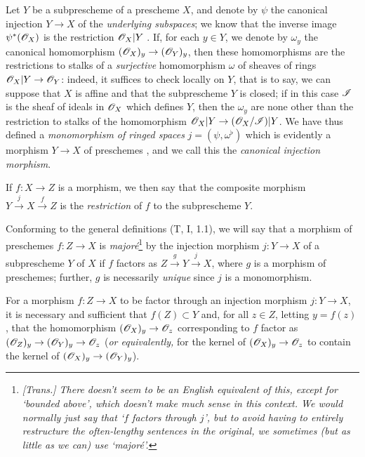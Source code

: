 \begin{env}[4.1.7]
\label{I.4.1.7}
Let $Y$ be a subprescheme of a prescheme $X$, and denote by $\psi$ the canonical injection $Y\to X$ of the \emph{underlying subspaces};
we know that the inverse image $\psi^*(\mathscr{O}_X)$ is the restriction $\mathscr{O}_X|Y$ .
If, for each $y\in Y$, we denote by $\omega_y$ the canonical homomorphism $(\sh{O}_X)_y\to(\sh{O}_Y)_y$, then these homomorphisms are the restrictions to stalks of a \emph{surjective} homomorphism $\omega$ of sheaves of rings $\sh{O}_X|Y\to\sh{O}_Y$: indeed, it suffices to check locally on $Y$, that is to say, we can suppose that $X$ is affine and that the subprescheme $Y$ is closed; if in this case $\mathscr{I}$ is the sheaf of ideals in $\mathscr{O}_X$ which defines $Y$, then the $\omega_y$ are none other than the restriction to stalks of the homomorphism $\sh{O}_X|Y\to(\sh{O}_X/\sh{I})|Y$.
We have thus defined a \emph{monomorphism of ringed spaces}  $j=(\psi,\omega^\flat)$ which is evidently a morphism $Y\to X$ of preschemes , and we call this the \emph{canonical injection morphism}.

If $f:X\to Z$ is a morphism, we then say that the composite morphism $Y\xrightarrow{j}X\xrightarrow{f}Z$ is the \emph{restriction} of $f$ to the subprescheme $Y$.
\end{env}

\begin{env}[4.1.8]
\label{I.4.1.8}
Conforming to the general definitions (T, I, 1.1), we will say that a morphism of preschemes $f:Z\to X$ is \emph{majoré}\footnote{\emph{[Trans.] There doesn't seem to be an English equivalent of this, except for `bounded above', which doesn't make much sense in this context. We would normally just say that `$f$ factors through $j$', but to avoid having to entirely restructure the often-lengthy sentences in the original, we sometimes (but as little as we can) use `majoré'.}} by the injection morphism $j:Y\to X$ of a subprescheme $Y$ of $X$ if $f$ factors as $Z\xrightarrow{g}Y\xrightarrow{j}X$, where $g$ is a morphism of preschemes;
further, $g$ is necessarily \emph{unique} since $j$ is a monomorphism.
\end{env}

\begin{proposition}[4.1.9]
\label{I.4.1.9}
For a morphism $f:Z\to X$ to be factor through an injection morphism $j:Y\to X$, it is necessary and sufficient that $f(Z)\subset Y$ and, for all $z\in Z$, letting $y=f(z)$, that the homomorphism $(\sh{O}_X)_y\to\sh{O}_z$ corresponding to $f$ factor as $(\sh{O}_Z)_y\to(\sh{O}_Y)_y\to\sh{O}_z$ (\emph{or equivalently,} for the kernel of $(\sh{O}_X)_y\to\sh{O}_z$ to contain the kernel of $(\sh{O}_X)_y\to(\sh{O}_Y)_y$).
\end{proposition}

